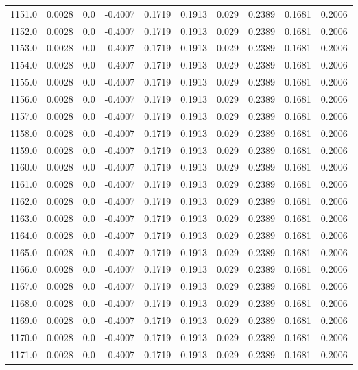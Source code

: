 \begin{longtable}{lrrrrrrrrr}
1151.0 & 0.0028 & 0.0 & -0.4007 & 0.1719 & 0.1913 & 0.029 & 0.2389 & 0.1681 & 0.2006 \\
1152.0 & 0.0028 & 0.0 & -0.4007 & 0.1719 & 0.1913 & 0.029 & 0.2389 & 0.1681 & 0.2006 \\
1153.0 & 0.0028 & 0.0 & -0.4007 & 0.1719 & 0.1913 & 0.029 & 0.2389 & 0.1681 & 0.2006 \\
1154.0 & 0.0028 & 0.0 & -0.4007 & 0.1719 & 0.1913 & 0.029 & 0.2389 & 0.1681 & 0.2006 \\
1155.0 & 0.0028 & 0.0 & -0.4007 & 0.1719 & 0.1913 & 0.029 & 0.2389 & 0.1681 & 0.2006 \\
1156.0 & 0.0028 & 0.0 & -0.4007 & 0.1719 & 0.1913 & 0.029 & 0.2389 & 0.1681 & 0.2006 \\
1157.0 & 0.0028 & 0.0 & -0.4007 & 0.1719 & 0.1913 & 0.029 & 0.2389 & 0.1681 & 0.2006 \\
1158.0 & 0.0028 & 0.0 & -0.4007 & 0.1719 & 0.1913 & 0.029 & 0.2389 & 0.1681 & 0.2006 \\
1159.0 & 0.0028 & 0.0 & -0.4007 & 0.1719 & 0.1913 & 0.029 & 0.2389 & 0.1681 & 0.2006 \\
1160.0 & 0.0028 & 0.0 & -0.4007 & 0.1719 & 0.1913 & 0.029 & 0.2389 & 0.1681 & 0.2006 \\
1161.0 & 0.0028 & 0.0 & -0.4007 & 0.1719 & 0.1913 & 0.029 & 0.2389 & 0.1681 & 0.2006 \\
1162.0 & 0.0028 & 0.0 & -0.4007 & 0.1719 & 0.1913 & 0.029 & 0.2389 & 0.1681 & 0.2006 \\
1163.0 & 0.0028 & 0.0 & -0.4007 & 0.1719 & 0.1913 & 0.029 & 0.2389 & 0.1681 & 0.2006 \\
1164.0 & 0.0028 & 0.0 & -0.4007 & 0.1719 & 0.1913 & 0.029 & 0.2389 & 0.1681 & 0.2006 \\
1165.0 & 0.0028 & 0.0 & -0.4007 & 0.1719 & 0.1913 & 0.029 & 0.2389 & 0.1681 & 0.2006 \\
1166.0 & 0.0028 & 0.0 & -0.4007 & 0.1719 & 0.1913 & 0.029 & 0.2389 & 0.1681 & 0.2006 \\
1167.0 & 0.0028 & 0.0 & -0.4007 & 0.1719 & 0.1913 & 0.029 & 0.2389 & 0.1681 & 0.2006 \\
1168.0 & 0.0028 & 0.0 & -0.4007 & 0.1719 & 0.1913 & 0.029 & 0.2389 & 0.1681 & 0.2006 \\
1169.0 & 0.0028 & 0.0 & -0.4007 & 0.1719 & 0.1913 & 0.029 & 0.2389 & 0.1681 & 0.2006 \\
1170.0 & 0.0028 & 0.0 & -0.4007 & 0.1719 & 0.1913 & 0.029 & 0.2389 & 0.1681 & 0.2006 \\
1171.0 & 0.0028 & 0.0 & -0.4007 & 0.1719 & 0.1913 & 0.029 & 0.2389 & 0.1681 & 0.2006 \\

\end{longtable}
